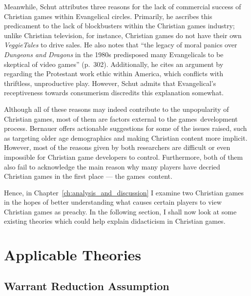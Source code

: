 Meanwhile, Schut attributes three reasons for the lack of commercial success of Christian games within Evangelical circles. Primarily, he ascribes this predicament to the lack of blockbusters within the Christian games industry; unlike Christian television, for instance, Christian games do not have their own \textit{VeggieTales} \parencite{vischer_veggietales_1993_2015} to drive sales. He also notes that ``the legacy of moral panics over \textit{Dungeons and Dragons} in the 1980s predisposed many Evangelicals to be skeptical of video games'' (p.~302). Additionally, he cites an argument by \textcite{moon_channel_why_2023} regarding the Protestant work ethic within America, which conflicts with thriftless, unproductive play. However, Schut admits that Evangelical's receptiveness towards consumerism discredits this explanation somewhat.

Although all of these reasons may indeed contribute to the unpopularity of Christian games, most of them are factors external to the games\textquotesingle\ development process. Bernauer offers actionable suggestions for some of the issues raised, such as targeting older age demographics and making Christian content more implicit. However, most of the reasons given by both researchers are difficult or even impossible for Christian game developers to control. Furthermore, both of them also fail to acknowledge the main reason why many players have decried Christian games in the first place --- the games\textquotesingle\ content. 

Hence, in Chapter~\ref{ch:analysis_and_discussion} I examine two Christian games in the hopes of better understanding what causes certain players to view Christian games as preachy. In the following section, I shall now look at some existing theories which could help explain didacticism in Christian games.

\section{Applicable Theories} \label{sec:applicable_theories}

\subsection{Warrant Reduction Assumption} \label{sec:warrant_reduction_assumption}


